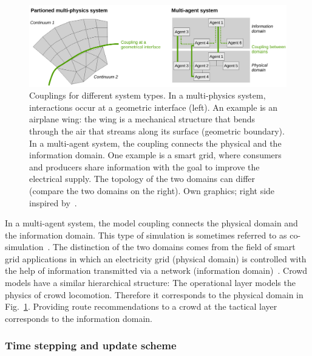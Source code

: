 \begin{figure}[hbt!]
\includegraphics[width=\textwidth]{../figures/state-of-the-art/coupling/modelcouplingapproaches.pdf} 
\caption{Couplings for different system types. In a multi-physics system, interactions occur at a geometric interface (left). An example is an airplane wing: the wing is a mechanical structure that bends through the air that streams along its surface (geometric boundary). In a multi-agent system, the coupling connects the physical and the information domain. One example is a smart   grid, where consumers and producers share information with the goal to improve the electrical supply. The topology of the two domains can differ (compare the two domains on the right). Own graphics; right side inspired by~\cite{schuette-2012-cs}. }
\label{fig:modelcouplingapproaches}
\end{figure}
In a multi-agent system, the model coupling connects the physical domain and the information domain. This type of simulation is sometimes referred to as co-simulation~\cite{schloegl-2015-cs}. The distinction of the two domains comes from the field of smart grid applications in which an electricity grid (physical domain) is controlled with the help of information transmitted via a network (information domain)~\cite{schuette-2012-cs,steinbrink-2019-cs,comet-2022-cs,binder-2021-cdyn}.   Crowd models have a similar hierarchical structure: The operational layer models the physics of crowd locomotion. Therefore it corresponds to the physical domain in Fig.~\ref{fig:modelcouplingapproaches}. Providing route recommendations to a crowd at the tactical layer corresponds to the information domain. 


\subsubsection{Time stepping and update scheme}

